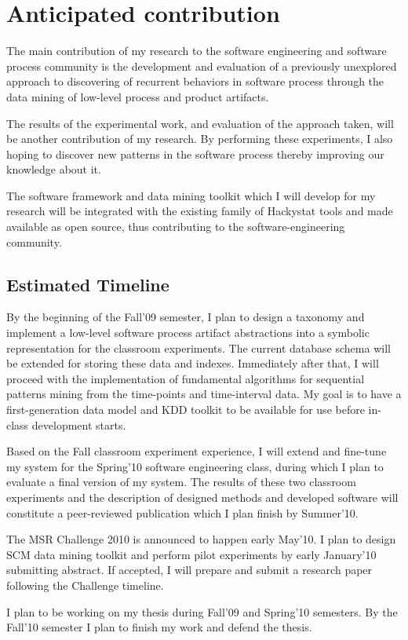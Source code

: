 \chapter{Anticipated contribution} \label{contribution}
The main contribution of my research to the software engineering and software process community is the development and evaluation of a previously unexplored approach to discovering of recurrent behaviors in software process through the data mining of low-level process and product artifacts.

The results of the experimental work, and evaluation of the approach taken, will be another contribution of my research. By performing these experiments, I also hoping to discover new patterns in the software process thereby improving our knowledge about it.

The software framework and data mining toolkit which I will develop for my research will be integrated with the existing family of Hackystat tools and made available as open source, thus contributing to the software-engineering community.

\section{Estimated Timeline}
By the beginning of the Fall'09 semester, I plan to design a taxonomy and implement a low-level software process artifact abstractions into a symbolic representation for the classroom experiments. The current database schema will be extended for storing these data and indexes. Immediately after that, I will proceed with the implementation of fundamental algorithms for sequential patterns mining from the time-points and time-interval data. My goal is to have a first-generation data model and KDD toolkit to be available for use before in-class development starts. 

Based on the Fall classroom experiment experience, I will extend and fine-tune my system for the Spring'10 software engineering class, during which I plan to evaluate a final version of my system. The results of these two classroom experiments and the description of designed methods and developed software will constitute a peer-reviewed publication which I plan finish by Summer'10.

The MSR Challenge 2010 is announced to happen early May'10. I plan to design SCM data mining toolkit and perform pilot experiments by early January'10 submitting abstract. If accepted, I will prepare and submit a research paper following the Challenge timeline.

I plan to be working on my thesis during Fall'09 and Spring'10 semesters.  By the Fall'10 semester I plan to finish my work and defend the thesis.
